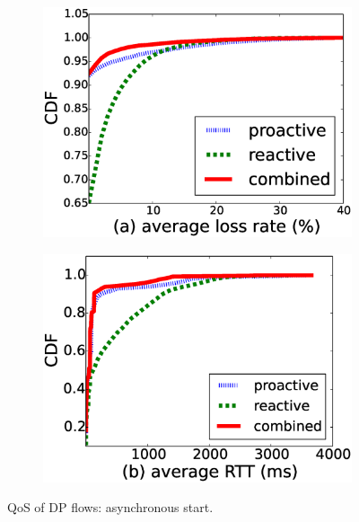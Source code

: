 \begin{figure}[!t]
  \begin{subfigure}[t]{0.49\linewidth}
   \centering
   \includegraphics[width=\columnwidth]{chap-scalims/figure/nonsyn-rttloss1.eps}
  \end{subfigure}
  \begin{subfigure}[t]{0.49\linewidth}
     \centering
     \includegraphics[width=\columnwidth]{chap-scalims/figure/nonsyn-rttloss2.eps}
    \end{subfigure}
\caption{QoS of DP flows: asynchronous start.}
\label{fig:nonsyn-rttloss}
\vspace{-4mm}
\end{figure}


